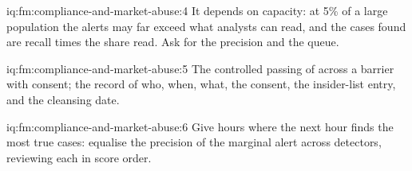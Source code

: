 \begin{solution}{iq:fm:compliance-and-market-abuse:4}
It depends on capacity: at 5\% of a large population the alerts may far exceed what analysts can read, and the cases found are recall times the
share read. Ask for the precision and the queue.
\end{solution}

\begin{solution}{iq:fm:compliance-and-market-abuse:5}
The controlled passing of  across a barrier with consent; the record of who, when, what, the consent, the insider-list entry,
and the cleansing date.
\end{solution}

\begin{solution}{iq:fm:compliance-and-market-abuse:6}
Give hours where the next hour finds the most true cases: equalise the precision of the marginal alert across detectors, reviewing each in score
order.
\end{solution}

